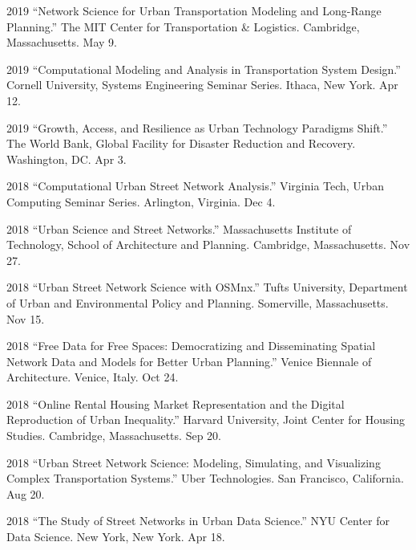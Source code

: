 \documentclass[12pt,letterpaper]{report}
\begin{document}
	\begin{tablist}

		\item[2019] \tab \enquote{Network Science for Urban Transportation Modeling and Long-Range Planning.} The MIT Center for Transportation \& Logistics. Cambridge, Massachusetts. May 9.

		\item[2019] \tab \enquote{Computational Modeling and Analysis in Transportation System Design.} Cornell University, Systems Engineering Seminar Series. Ithaca, New York. Apr 12.

		\item[2019] \tab \enquote{Growth, Access, and Resilience as Urban Technology Paradigms Shift.} The World Bank, Global Facility for Disaster Reduction and Recovery. Washington, DC. Apr 3.

		\item[2018] \tab \enquote{Computational Urban Street Network Analysis.} Virginia Tech, Urban Computing Seminar Series. Arlington, Virginia. Dec 4.

		\item[2018] \tab \enquote{Urban Science and Street Networks.} Massachusetts Institute of Technology, School of Architecture and Planning. Cambridge, Massachusetts. Nov 27.

		\item[2018] \tab \enquote{Urban Street Network Science with OSMnx.} Tufts University, Department of Urban and Environmental Policy and Planning. Somerville, Massachusetts. Nov 15.

		\item[2018] \tab \enquote{Free Data for Free Spaces: Democratizing and Disseminating Spatial Network Data and Models for Better Urban Planning.} Venice Biennale of Architecture. Venice, Italy. Oct 24.

		\item[2018] \tab \enquote{Online Rental Housing Market Representation and the Digital Reproduction of Urban Inequality.} Harvard University, Joint Center for Housing Studies. Cambridge, Massachusetts. Sep 20.

		\item[2018] \tab \enquote{Urban Street Network Science: Modeling, Simulating, and Visualizing Complex Transportation Systems.} Uber Technologies. San Francisco, California. Aug 20.

		\item[2018] \tab \enquote{The Study of Street Networks in Urban Data Science.} NYU Center for Data Science. New York, New York. Apr 18.


\end{tablist}
\end{document}
